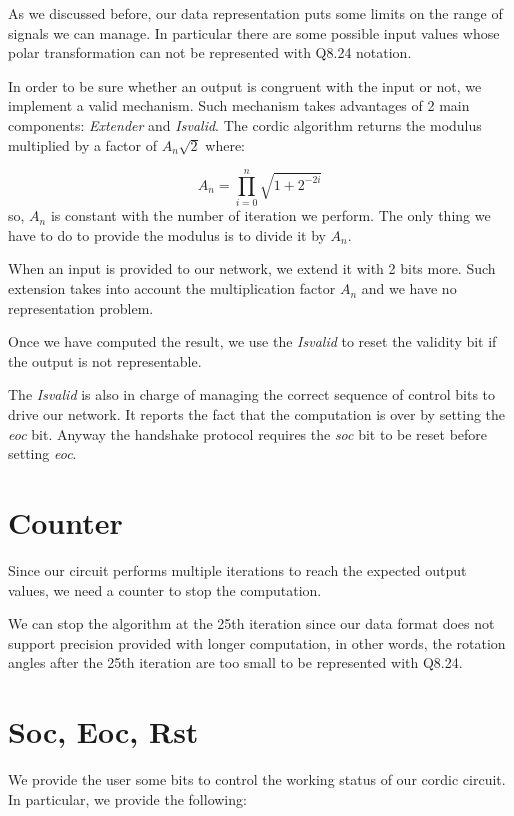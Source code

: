 \documentclass[12pt,a4paper]{report}
\begin{document}
As we discussed before, our data representation puts some limits on the range of signals we can manage. In particular there are some possible input values whose polar transformation can not be represented with Q8.24 notation.

In order to be sure whether an output is congruent with the input or not, we implement a valid mechanism.
Such mechanism takes advantages of 2 main components: \emph{Extender} and \emph{Is\textunderscore valid}.
The cordic algorithm returns the modulus multiplied by a factor of $A_{n}\sqrt{2}$ where:
 
\begin{equation}
A_n = \prod_{i = 0}^n{\sqrt{1+2^{-2i}}}
\end{equation}
so, $A_n$ is constant with the number of iteration we perform. The only thing we have to do to provide the modulus is to divide it by $A_n$.

When an input is provided to our network, we extend it with 2 bits more. Such extension takes into account the multiplication factor $A_n$ and we have no representation problem.

Once we have computed the result, we use the \emph{Is\textunderscore valid} to reset the validity bit if the output is not representable.

The \emph{Is\textunderscore valid} is also in charge of managing the correct sequence of control bits to drive our network. It reports the fact that the computation is over by setting the \emph{eoc} bit. Anyway the handshake protocol requires the \emph{soc} bit to be reset before setting \emph{eoc}.

\section{Counter}
Since our circuit performs multiple iterations to reach the expected output values, we need a counter to stop the computation.

We can stop the algorithm at the 25th iteration since our data format does not support precision provided with longer computation, in other words, the rotation angles after the 25th iteration are too small to be represented with Q8.24.

\section{Soc, Eoc, Rst}
We provide the user some bits to control the working status of our cordic circuit. In particular, we provide the following:
\end{document}
